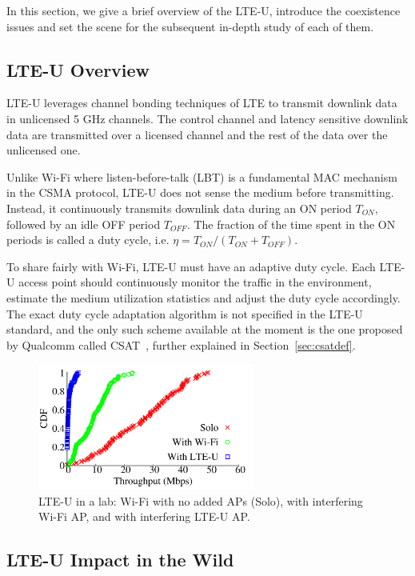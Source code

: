 
In this section, we give a brief overview of the LTE-U, 
introduce the coexistence issues and set the scene for the subsequent in-depth study of each of them. 

\subsection{LTE-U Overview}

LTE-U leverages channel bonding techniques of LTE to transmit downlink data in unlicensed 5 GHz channels. The control channel and latency sensitive downlink data are transmitted over a licensed channel and the rest of the data over the unlicensed one. 

Unlike Wi-Fi where listen-before-talk (LBT) is a fundamental MAC mechanism in the CSMA protocol, LTE-U does not sense the medium before transmitting. Instead, it continuously transmits downlink data during an ON period $T_{ON}$, followed by an idle OFF period $T_{OFF}$. The fraction of the time spent in the ON periods is called a duty cycle, i.e. $\eta = T_{ON} / (T_{ON} + T_{OFF})$. 


To share fairly with Wi-Fi, LTE-U must have an adaptive duty cycle. 
Each LTE-U access point should continuously monitor the traffic in the environment, 
estimate the medium utilization statistics and 
adjust the duty cycle accordingly. The exact duty cycle adaptation algorithm is not specified in the LTE-U standard, and the only such scheme available at the moment is the one proposed by Qualcomm called CSAT~\cite{lteuforum_csat}, further explained in Section~\ref{sec:csatdef}.


\begin{figure}[!ht]
 \centering
    \includegraphics[width=2.8in]{./figures/motivation}
 \caption{LTE-U in a lab: Wi-Fi with no added APs (Solo), with interfering Wi-Fi AP, and with interfering LTE-U AP.}
  \label{fig:lteu_lab}
\end{figure}



\subsection{LTE-U Impact in the Wild}

